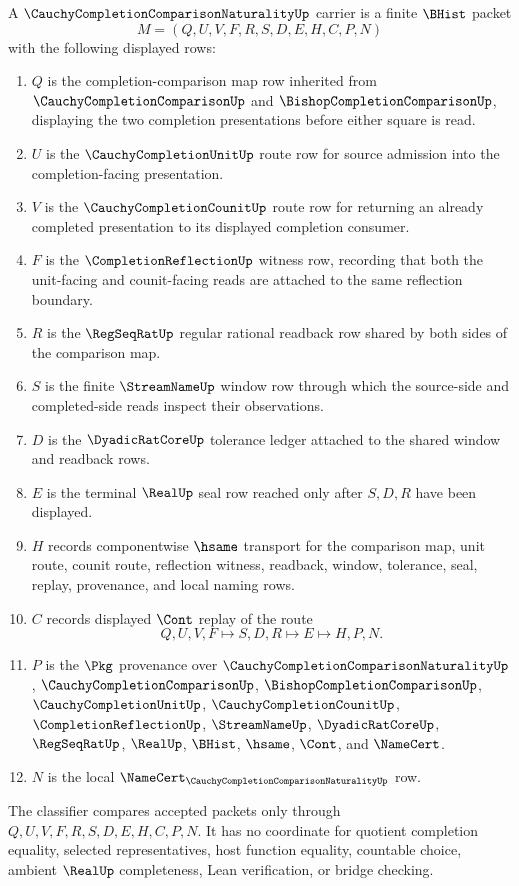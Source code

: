 \begin{definition}
\label{def:cauchy-completion-comparison-naturality-carrier}
A $\CauchyCompletionComparisonNaturalityUp$ carrier is a finite $\BHist$ packet
$$
M=(Q,U,V,F,R,S,D,E,H,C,P,N)
$$
with the following displayed rows:
\begin{enumerate}
\item $Q$ is the completion-comparison map row inherited from $\CauchyCompletionComparisonUp$ and $\BishopCompletionComparisonUp$, displaying the two completion presentations before either square is read.
\item $U$ is the $\CauchyCompletionUnitUp$ route row for source admission into the completion-facing presentation.
\item $V$ is the $\CauchyCompletionCounitUp$ route row for returning an already completed presentation to its displayed completion consumer.
\item $F$ is the $\CompletionReflectionUp$ witness row, recording that both the unit-facing and counit-facing reads are attached to the same reflection boundary.
\item $R$ is the $\RegSeqRatUp$ regular rational readback row shared by both sides of the comparison map.
\item $S$ is the finite $\StreamNameUp$ window row through which the source-side and completed-side reads inspect their observations.
\item $D$ is the $\DyadicRatCoreUp$ tolerance ledger attached to the shared window and readback rows.
\item $E$ is the terminal $\RealUp$ seal row reached only after $S,D,R$ have been displayed.
\item $H$ records componentwise $\hsame$ transport for the comparison map, unit route, counit route, reflection witness, readback, window, tolerance, seal, replay, provenance, and local naming rows.
\item $C$ records displayed $\Cont$ replay of the route
$$
Q,U,V,F \longmapsto S,D,R \longmapsto E \longmapsto H,P,N .
$$
\item $P$ is the $\Pkg$ provenance over $\CauchyCompletionComparisonNaturalityUp$, $\CauchyCompletionComparisonUp$, $\BishopCompletionComparisonUp$, $\CauchyCompletionUnitUp$, $\CauchyCompletionCounitUp$, $\CompletionReflectionUp$, $\StreamNameUp$, $\DyadicRatCoreUp$, $\RegSeqRatUp$, $\RealUp$, $\BHist$, $\hsame$, $\Cont$, and $\NameCert$.
\item $N$ is the local $\NameCert_{\CauchyCompletionComparisonNaturalityUp}$ row.
\end{enumerate}
The classifier compares accepted packets only through $Q,U,V,F,R,S,D,E,H,C,P,N$. It has no coordinate for quotient completion equality, selected representatives, host function equality, countable choice, ambient $\RealUp$ completeness, Lean verification, or bridge checking.
\end{definition}


